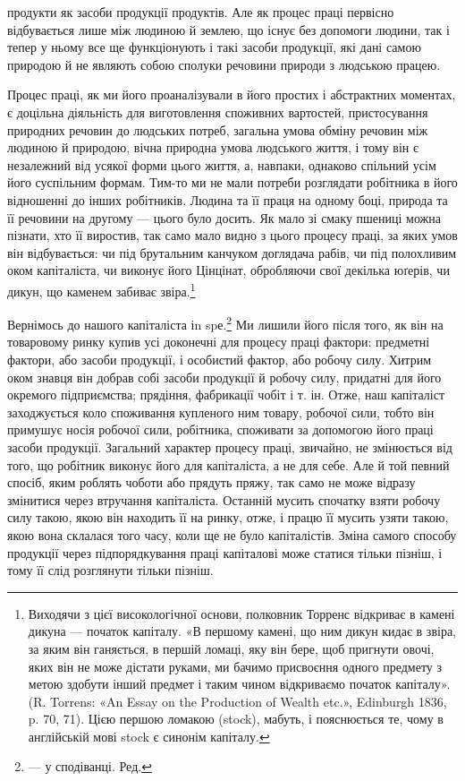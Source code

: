 \parcont{}  %
продукти як засоби продукції продуктів. Але як процес праці
первісно відбувається лише між людиною й землею, що існує
без допомоги людини, так і тепер у ньому все ще функціонують
і такі засоби продукції, які дані самою природою й не являють
собою сполуки речовини природи з людською працею.

Процес праці, як ми його проаналізували в його простих і абстрактних
моментах, є доцільна діяльність для виготовлення
споживних вартостей, пристосування природних речовин до
людських потреб, загальна умова обміну речовин між людиною
й природою, вічна природна умова людського життя, і тому він
є незалежний від усякої форми цього життя, а, навпаки, однаково
спільний усім його суспільним формам. Тим-то ми не мали
потреби розглядати робітника в його відношенні до інших робітників.
Людина та її праця на одному боці, природа та її речовини
на другому — цього було досить. Як мало зі смаку пшениці
можна пізнати, хто її виростив, так само мало видно з цього процесу
праці, за яких умов він відбувається: чи під брутальним
канчуком доглядача рабів, чи під полохливим оком капіталіста,
чи виконує його Цінцінат, обробляючи свої декілька юґерів,
чи дикун, що каменем забиває звіра.\footnote{
Виходячи з цієї високологічної основи, полковник Торренс відкриває
в камені дикуна — початок капіталу. «В першому камені, що ним
дикун кидає в звіра, за яким він ганяється, в першій ломаці, яку він бере,
щоб пригнути овочі, яких він не може дістати руками, ми бачимо присвоєння
одного предмету з метою здобути інший предмет і таким чином
відкриваємо початок капіталу». (R. Torrens: «An Essay on the
Production of Wealth etc.», Edinburgh 1836, p. 70, 71). Цією першою
ломакою (stock), мабуть, і пояснюється те, чому в англійській мові stock
є синонім капіталу.
}

Вернімось до нашого капіталіста іn spе.\footnote*{
— у сподіванці. Ред.
} Ми лишили його
після того, як він на товаровому ринку купив усі доконечні
для процесу праці фактори: предметні фактори, або засоби продукції,
і особистий фактор, або робочу силу. Хитрим оком знавця
він добрав собі засоби продукції й робочу силу, придатні для
його окремого підприємства; прядіння, фабрикації чобіт і т. ін.
Отже, наш капіталіст заходжується коло споживання купленого
ним товару, робочої сили, тобто він примушує носія робочої сили,
робітника, споживати за допомогою його праці засоби продукції.
Загальний характер процесу праці, звичайно, не змінюється від
того, що робітник виконує його для капіталіста, а не для себе.
Але й той певний спосіб, яким роблять чоботи або прядуть пряжу,
так само не може відразу змінитися через втручання капіталіста.
Останній мусить спочатку взяти робочу силу такою, якою він
находить її на ринку, отже, і працю її мусить узяти такою, якою
вона склалася того часу, коли ще не було капіталістів. Зміна
самого способу продукції через підпорядкування праці капіталові
може статися тільки пізніш, і тому її слід розглянути
тільки пізніш.
